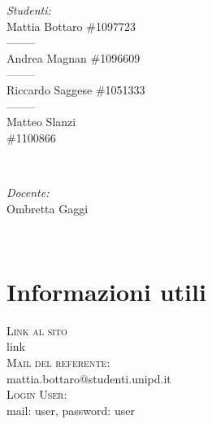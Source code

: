\begin{titlepage}
	\begin{minipage}{0.4\textwidth}
	\begin{flushleft} \large
	\emph{Studenti:}\\
	Mattia Bottaro \#1097723 \\--------\\ Andrea Magnan \#1096609 \\--------\\ Riccardo Saggese \#1051333 \\--------\\ Matteo Slanzi \\ \#1100866
	\end{flushleft}
	\end{minipage}
	~
	\begin{minipage}{0.4\textwidth}
	\begin{flushright} \large
	\emph{Docente:} \\
	Ombretta Gaggi
	\end{flushright}
	\end{minipage}\\[2cm]
	
	
	
	
	
	
	
	\vfill %
	
	\end{titlepage}
	\newpage
	\section{Informazioni utili}
	\textsc{\Large Link al sito\\ }link\\[0.5cm]
	\textsc{\Large Mail del referente:\\ }mattia.bottaro@studenti.unipd.it\\[0.5cm]
	\textsc{\Large Login User:}\\[0.5cm] mail: user, password: user 
	\newpage
	\tableofcontents
	\listoffigures
	\listoftables
	\newpage
	
